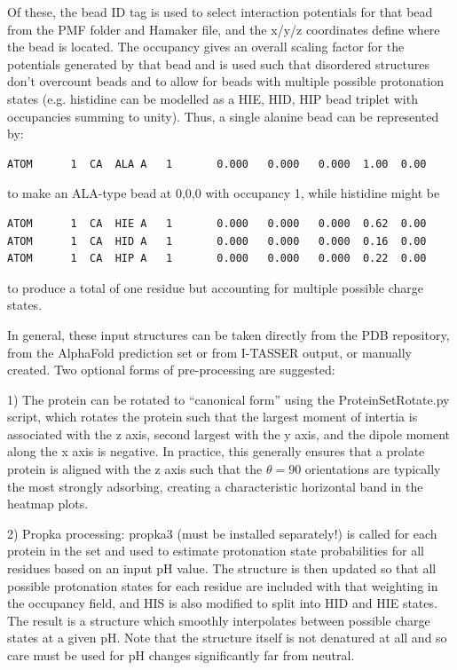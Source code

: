 \documentclass[10pt,a4paper,onecolumn]{report}
\begin{document}
Of these, the bead ID tag is used to select interaction potentials for that bead from the PMF folder and Hamaker file, and the x/y/z coordinates define where the bead is located. The occupancy gives an overall scaling factor for the potentials generated by that bead and is used such that disordered structures don't overcount beads and to allow for beads with multiple possible protonation states (e.g. histidine can be modelled as a HIE, HID, HIP bead triplet with occupancies summing to unity).  Thus, a single alanine bead can be represented by:

\begin{lstlisting}
ATOM      1  CA  ALA A   1       0.000   0.000   0.000  1.00  0.00
\end{lstlisting}
to make an ALA-type bead at 0,0,0 with occupancy 1, while histidine might be
\begin{lstlisting}
ATOM      1  CA  HIE A   1       0.000   0.000   0.000  0.62  0.00
ATOM      1  CA  HID A   1       0.000   0.000   0.000  0.16  0.00
ATOM      1  CA  HIP A   1       0.000   0.000   0.000  0.22  0.00
\end{lstlisting}
to produce a total of one residue but accounting for multiple possible charge states. 


In general, these input structures can be taken directly from the PDB repository, from the AlphaFold prediction set or from I-TASSER output, or manually created. Two optional forms of pre-processing are suggested:

1) The protein can be rotated to ``canonical form'' using the ProteinSetRotate.py script, which rotates the protein such that the largest moment of intertia is associated with the z axis, second largest with the y axis, and the dipole moment along the x axis is negative. In practice, this generally ensures that a prolate protein is aligned with the z axis such that the $\theta = 90$ orientations are typically the most strongly adsorbing, creating a characteristic horizontal band in the heatmap plots. 

2) Propka processing: propka3 (must be installed separately!) is called for each protein in the set and used to estimate protonation state probabilities for all residues based on an input pH value. The structure is then updated so that all possible protonation states for each residue are included with that weighting in the occupancy field, and HIS is also modified to split into HID and HIE states. The result is a structure which smoothly interpolates between possible charge states at a given pH. Note that the structure itself is not denatured at all and so care must be used for pH changes significantly far from neutral. 
\end{document}
